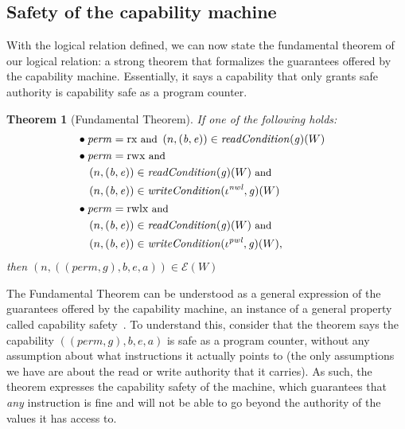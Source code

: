 \documentclass[compsoc,conference,letterpaper,fleqn]{IEEEtran}
\newtheorem{theorem}{Theorem}
\newcommand{\var}[1]{\mathit{#1}}
\newcommand{\gl}{\var{g}}
\newcommand{\addr}{\var{a}}
\newcommand{\start}{\var{b}}
\newcommand{\addrend}{\var{e}}
\newcommand{\perm}{\var{perm}}
\newcommand{\nwl}{\var{nwl}}
\newcommand{\pwl}{\var{pwl}}
\newcommand{\plainfun}[2]{
  \ifthenelse{\equal{#2}{}}
  {\mathit{#1}}
  {\mathit{#1}(#2)}
}
\newcommand{\readCond}[1]{\plainfun{readCondition}{#1}}
\newcommand{\writeCond}[1]{\plainfun{writeCondition}{#1}}
\newcommand{\asmType}{\plaindom{AsmType}}
\newcommand{\plaindom}[1]{\mathrm{#1}}
\newcommand{\intr}[2]{\mathcal{#1}}
\newcommand{\exprintr}[1]{\intr{E}{#1}}
\newcommand{\stder}{\exprintr{\asmType}}
\newcommand{\npair}[2][n]{\left(#1,#2 \right)}
\newcommand{\plainperm}[1]{\mathrm{#1}}
\newcommand{\exec}{\plainperm{rx}}
\newcommand{\rwx}{\plainperm{rwx}}
\newcommand{\rwlx}{\plainperm{rwlx}}
\begin{document}
\subsection{Safety of the capability machine}
With the logical relation defined, we can now state the fundamental theorem of
our logical relation: a strong theorem that formalizes the guarantees offered by
the capability machine. Essentially, it says a capability that only grants
safe authority is capability safe as a program counter.
\begin{theorem}[Fundamental Theorem]
  \label{thm:ftlr}
  If one of the following holds:
  \begin{align*}
      & \bullet
        \begin{aligned}[t]
        &\perm = \exec \text{\footnotesize{ and }}\npair{(\start,\addrend)} \in \readCond{}(\gl)(W)
      \end{aligned} \\
    & \bullet 
      \begin{aligned}[t]
        &\perm = \rwx \text{\footnotesize{ and }} \\
        &\npair{(\start,\addrend)} \in \readCond{}(\gl)(W) \text{\footnotesize{ and }}\\
        &\npair{(\start,\addrend)} \in \writeCond{}(\iota^\nwl,\gl)(W)
      \end{aligned} \\
    & \bullet 
      \begin{aligned}[t]
        &\perm = \rwlx \text{\footnotesize{ and }}\\
        &\npair{(\start,\addrend)} \in \readCond{}(\gl)(W) \text{\footnotesize{ and }}\\
        &\npair{(\start,\addrend)} \in \writeCond{}(\iota^\pwl,\gl)(W),
      \end{aligned}
  \end{align*}
  then $\npair{((\perm,\gl),\start,\addrend,\addr)} \in \stder(W)$
\end{theorem}
The Fundamental Theorem can be understood as a general expression of the
guarantees offered by the capability machine, an instance of a general property
called capability safety~\citep{Devriese:2016ObjCap,Maffeis2010OC}. To
understand this, consider that the theorem says the capability
$((\perm,\gl),\start,\addrend,\addr)$ is safe as a program counter, without any
assumption about what instructions it actually points to (the only assumptions
we have are about the read or write authority that it carries). As such, the
theorem expresses the capability safety of the machine, which guarantees that
\emph{any} instruction is fine and will not be able to go beyond the authority
of the values it has access to.
\end{document}
